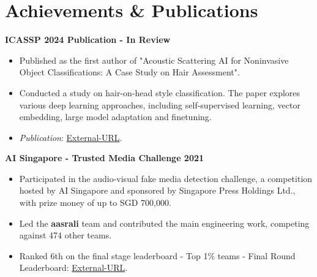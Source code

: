 \section{Achievements \& Publications}
\vspace{-2mm}
\begin{multicols}{1}
    \begin{flushleft}
        \textbf{ICASSP 2024 Publication - In Review}
    \end{flushleft}
\end{multicols}

\vspace{-5mm}

\begin{itemize}[noitemsep,leftmargin=*]
    \item Published as the first author of "Acoustic Scattering AI for Noninvasive Object Classifications: A Case Study on Hair Assessment". 
    \item Conducted a study on hair-on-head style classification. The paper explores various deep learning approaches, including self-supervised learning, vector embedding, large model adaptation and finetuning.
    \item \emph{Publication}: \href{https://cmsworkshops.com/ICASSP2024/Papers/Uploads/Proposals/PaperNum/3237/20230914045939_141442_3237.pdf}{External-URL}.
\end{itemize}

\begin{multicols}{1}
    \begin{flushleft}
        \textbf{AI Singapore - Trusted Media Challenge 2021}
    \end{flushleft}
\end{multicols}

\vspace{-5mm}

\begin{itemize}[noitemsep,leftmargin=*]
    \item Participated in the audio-visual fake media detection challenge, a competition hosted by AI Singapore and sponsored by Singapore Press Holdings Ltd., with prize money of up to SGD 700,000.
    \item Led the \textbf{aasrali} team and contributed the main engineering work, competing against 474 other teams.
    \item Ranked 6th on the final stage leaderboard - Top 1\% teams - Final Round Leaderboard: \href{https://trustedmedia.aisingapore.org/competition/aisg/final-leaderboard/}{External-URL}.
\end{itemize}

